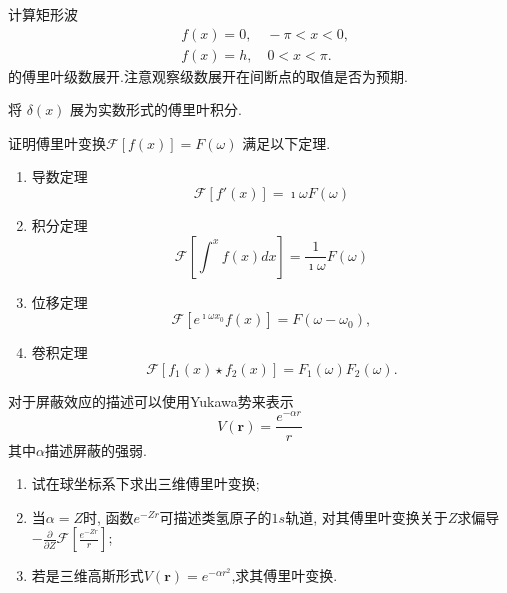 \documentclass[10pt]{article}
\newenvironment{problem}[2][]{\begin{trivlist}
\item[\hskip \labelsep {\bfseries #1}\hskip \labelsep {\bfseries #2}]}{\end{trivlist}}
\begin{document}
\renewcommand{\labelenumi}{(\arabic{enumi})}
\renewcommand{\labelenumii}{(\arabic{enumi}.\arabic{enumii})}



 




\begin{problem}{6.1}
  
计算矩形波$$
\begin{aligned}
& f(x)=0, \quad-\pi<x<0, \\
& f(x)=h, \quad 0<x<\pi .
\end{aligned}
$$
的傅里叶级数展开.注意观察级数展开在间断点的取值是否为预期.
\end{problem}

\begin{problem}{6.2}
  将 $\delta(x)$ 展为实数形式的傅里叶积分.
\end{problem}
  
\begin{problem}{6.3}
证明傅里叶变换$\mathcal{F}[f(x)] = F(\omega)$ 满足以下定理.
\begin{enumerate}
  \item 导数定理
  $$
      \mathcal{F} [f'(x)] = \imath \omega F(\omega)
  $$

  \item 积分定理
  $$
      \mathcal{F} [ \int^{x} f(x) dx ] = \frac{1}{\imath \omega} F(\omega)
  $$
  \item 位移定理
  $$
      \mathcal{F} [ e^{\imath \omega x_0} f(x) ] = F(\omega - \omega_0),
  $$
  \item 卷积定理
  $$
      \mathcal{F} [f_1(x)\star f_2(x) ] = F_1(\omega) F_2(\omega).
  $$
\end{enumerate}
\end{problem}
   
\begin{problem}{6.4}
对于屏蔽效应的描述可以使用Yukawa势来表示
$$
V(\mathbf{r}) = \frac{e^{-\alpha r}}{r}
$$
其中$\alpha$描述屏蔽的强弱.
\begin{enumerate}
  \item 试在球坐标系下求出三维傅里叶变换;
  \item 当$\alpha=Z$时, 函数$e^{-Zr}$可描述类氢原子的$1s$轨道, 对其傅里叶变换关于$Z$求偏导
  $-\frac{\partial}{\partial Z} \mathcal{F} \left[ \frac{e^{-Z r}}{r}\right]$;
  \item 若是三维高斯形式$V(\mathbf{r}) = e^{-\alpha r^2}$,求其傅里叶变换.
\end{enumerate}
\end{problem}
\end{document}
